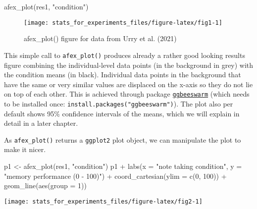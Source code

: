\documentclass[
]{book}
\newenvironment{Shaded}{\begin{snugshade}}{\end{snugshade}}
\newcommand{\AttributeTok}[1]{\textcolor[rgb]{0.77,0.63,0.00}{#1}}
\newcommand{\DecValTok}[1]{\textcolor[rgb]{0.00,0.00,0.81}{#1}}
\newcommand{\FunctionTok}[1]{\textcolor[rgb]{0.00,0.00,0.00}{#1}}
\newcommand{\NormalTok}[1]{#1}
\newcommand{\OtherTok}[1]{\textcolor[rgb]{0.56,0.35,0.01}{#1}}
\newcommand{\SpecialCharTok}[1]{\textcolor[rgb]{0.00,0.00,0.00}{#1}}
\newcommand{\StringTok}[1]{\textcolor[rgb]{0.31,0.60,0.02}{#1}}
\begin{document}
\begin{Shaded}
\begin{Highlighting}[]
\FunctionTok{afex\_plot}\NormalTok{(res1, }\StringTok{"condition"}\NormalTok{)}
\end{Highlighting}
\end{Shaded}

\begin{figure}

{\centering \texttt{[image: stats\_for\_experiments\_files/figure-latex/fig1-1]} 

}

\caption{afex\_plot() figure for data from Urry et al. (2021)}\label{fig:fig1}
\end{figure}

This simple call to \texttt{afex\_plot()} produces already a rather good looking results figure combining the individual-level data points (in the background in grey) with the condition means (in black). Individual data points in the background that have the same or very similar values are displaced on the x-axis so they do not lie on top of each other. This is achieved through package \href{https://cran.r-project.org/package=ggbeeswarm}{\texttt{ggbeeswarm}} (which needs to be installed once: \texttt{install.packages("ggbeeswarm")}). The plot also per default shows 95\% confidence intervals of the means, which we will explain in detail in a later chapter.

As \texttt{afex\_plot()} returns a \texttt{ggplot2} plot object, we can manipulate the plot to make it nicer.

\begin{Shaded}
\begin{Highlighting}[]
\NormalTok{p1 }\OtherTok{\textless{}{-}} \FunctionTok{afex\_plot}\NormalTok{(res1, }\StringTok{"condition"}\NormalTok{)}
\NormalTok{p1 }\SpecialCharTok{+} 
  \FunctionTok{labs}\NormalTok{(}\AttributeTok{x =} \StringTok{"note taking condition"}\NormalTok{, }\AttributeTok{y =} \StringTok{"memory performance (0 {-} 100)"}\NormalTok{) }\SpecialCharTok{+}
  \FunctionTok{coord\_cartesian}\NormalTok{(}\AttributeTok{ylim =} \FunctionTok{c}\NormalTok{(}\DecValTok{0}\NormalTok{, }\DecValTok{100}\NormalTok{)) }\SpecialCharTok{+}
  \FunctionTok{geom\_line}\NormalTok{(}\FunctionTok{aes}\NormalTok{(}\AttributeTok{group =} \DecValTok{1}\NormalTok{))}
\end{Highlighting}
\end{Shaded}

\begin{center}\texttt{[image: stats\_for\_experiments\_files/figure-latex/fig2-1]} \end{center}
\end{document}
